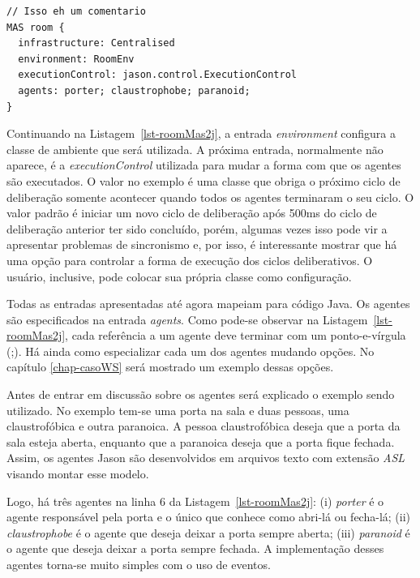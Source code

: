 \begin{center}
    \begin{minipage}{120mm}
	\begin{lstlisting}[frame=trbl, caption=Arquivo de projeto do Jason para o exemplo \emph{Room}, label=lst-roomMas2j]
// Isso eh um comentario
MAS room {
  infrastructure: Centralised
  environment: RoomEnv
  executionControl: jason.control.ExecutionControl
  agents: porter; claustrophobe; paranoid;
}
	\end{lstlisting}
    \end{minipage}
\end{center}

Continuando na Listagem~\ref{lst-roomMas2j}, a entrada \emph{environment}
configura a classe de ambiente que será utilizada. A próxima entrada,
normalmente não aparece, é a \emph{executionControl} utilizada para
mudar a forma com que os agentes são executados. O valor no exemplo é uma
classe que obriga o próximo ciclo de deliberação somente acontecer quando
todos os agentes terminaram o seu ciclo. O valor padrão é iniciar um novo
ciclo de deliberação após 500ms do ciclo de deliberação anterior ter sido
concluído, porém, algumas vezes isso
pode vir a apresentar problemas de sincronismo e, por isso, é interessante
mostrar que há uma opção para controlar a forma de execução dos ciclos
deliberativos. O usuário, inclusive, pode colocar sua própria classe como
configuração.

Todas as entradas apresentadas até agora mapeiam para código Java.
Os agentes são especificados na entrada \emph{agents}. Como pode-se
observar na Listagem~\ref{lst-roomMas2j}, cada referência a um agente deve
terminar com um ponto-e-vírgula (;). Há ainda como especializar cada um dos
agentes mudando opções. No capítulo \ref{chap-casoWS} será mostrado um exemplo
dessas opções.

Antes de entrar em discussão sobre os agentes será explicado o exemplo sendo
utilizado. No exemplo tem-se uma porta na sala e duas pessoas, uma
claustrofóbica e outra paranoica. A pessoa claustrofóbica deseja que a
porta da sala esteja aberta, enquanto que a paranoica deseja que a porta
fique fechada. Assim, os agentes Jason são desenvolvidos em arquivos texto
com extensão \emph{ASL} visando montar esse modelo.

Logo, há três agentes na linha 6 da Listagem~\ref{lst-roomMas2j}:
(i) \emph{porter} é o agente responsável pela porta e o único que conhece
como abri-lá ou fecha-lá;
(ii) \emph{claustrophobe} é o agente que deseja deixar a porta sempre aberta;
(iii) \emph{paranoid} é o agente que deseja deixar a porta sempre fechada.
A implementação desses agentes torna-se muito simples com o uso de eventos.

